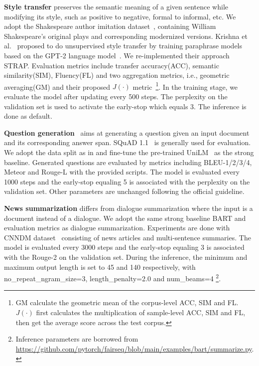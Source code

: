 \textbf{Style transfer} preserves the semantic meaning of a given sentence while modifying its style, such as positive to negative, formal to informal, etc.
We adopt the Shakespeare author imitation dataset~\cite{xu2012paraphrasing}, containing William Shakespeare's original plays and corresponding modernized versions. Krishna et al.~ proposed to do unsupervised style transfer by training paraphrase models based on the GPT-2 language model~\cite{radford2019language}. We re-implemented their approach STRAP. %
Evaluation metrics include
transfer accuracy(ACC), semantic similarity(SIM), Fluency(FL) and two aggregation metrics, i.e., geometric averaging(GM) and their proposed $J(\cdot)$ metric~\footnote{GM calculate the geometric mean of the corpus-level ACC, SIM and FL. $J(\cdot)$ first calculates the multiplication of sample-level ACC, SIM and FL, then get the average score across the test corpus.}. %
In the training stage, we evaluate the model after updating every 500 steps. The perplexity on the validation set is used to activate the early-stop which equals 3. The inference is done as default.
 
\textbf{Question generation}~\cite{zhou2017neural} aims at generating a question given an input document and its corresponding answer span. SQuAD 1.1~\cite{rajpurkar2016squad} is generally used for evaluation. We adopt the data split as in \cite{du2017learning} and fine-tune the pre-trained UniLM~\cite{dong2019unified} as the strong baseline. %
Generated questions are evaluated by metrics including BLEU-1/2/3/4, Meteor and Rouge-L with the provided scripts. The model is evaluated every 1000 steps and the early-stop equaling 5 is associated with the perplexity on the validation set. Other parameters are unchanged following the official guideline.

\textbf{News summarization} differs from dialogue summarization where the input is a document instead of a dialogue. We adopt the same strong baseline BART and evaluation metrics as dialogue summarization. Experiments are done with CNNDM dataset~\cite{HermannKGEKSB15} consisting of news articles and multi-sentence summaries. The model is evaluated every 3000 steps and the early-stop equaling 3 is associated with the Rouge-2 on the validation set. During the inference, the minimum and maximum output length is set to 45 and 140 respectively, with no\_repeat\_ngram\_size=3, length\_penalty=2.0 and num\_beams=4 \footnote{Inference parameters are borrowed from \url{https://github.com/pytorch/fairseq/blob/main/examples/bart/summarize.py}.}.

